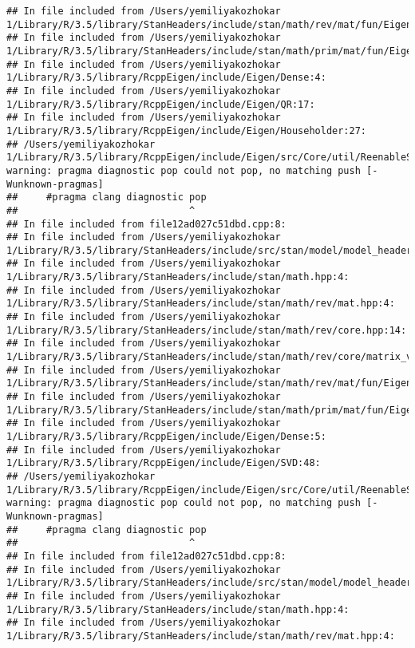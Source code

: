 \documentclass[]{article}
\begin{document}
\begin{verbatim}
## In file included from /Users/yemiliyakozhokar 1/Library/R/3.5/library/StanHeaders/include/stan/math/rev/mat/fun/Eigen_NumTraits.hpp:4:
## In file included from /Users/yemiliyakozhokar 1/Library/R/3.5/library/StanHeaders/include/stan/math/prim/mat/fun/Eigen.hpp:4:
## In file included from /Users/yemiliyakozhokar 1/Library/R/3.5/library/RcppEigen/include/Eigen/Dense:4:
## In file included from /Users/yemiliyakozhokar 1/Library/R/3.5/library/RcppEigen/include/Eigen/QR:17:
## In file included from /Users/yemiliyakozhokar 1/Library/R/3.5/library/RcppEigen/include/Eigen/Householder:27:
## /Users/yemiliyakozhokar 1/Library/R/3.5/library/RcppEigen/include/Eigen/src/Core/util/ReenableStupidWarnings.h:10:30: warning: pragma diagnostic pop could not pop, no matching push [-Wunknown-pragmas]
##     #pragma clang diagnostic pop
##                              ^
## In file included from file12ad027c51dbd.cpp:8:
## In file included from /Users/yemiliyakozhokar 1/Library/R/3.5/library/StanHeaders/include/src/stan/model/model_header.hpp:4:
## In file included from /Users/yemiliyakozhokar 1/Library/R/3.5/library/StanHeaders/include/stan/math.hpp:4:
## In file included from /Users/yemiliyakozhokar 1/Library/R/3.5/library/StanHeaders/include/stan/math/rev/mat.hpp:4:
## In file included from /Users/yemiliyakozhokar 1/Library/R/3.5/library/StanHeaders/include/stan/math/rev/core.hpp:14:
## In file included from /Users/yemiliyakozhokar 1/Library/R/3.5/library/StanHeaders/include/stan/math/rev/core/matrix_vari.hpp:4:
## In file included from /Users/yemiliyakozhokar 1/Library/R/3.5/library/StanHeaders/include/stan/math/rev/mat/fun/Eigen_NumTraits.hpp:4:
## In file included from /Users/yemiliyakozhokar 1/Library/R/3.5/library/StanHeaders/include/stan/math/prim/mat/fun/Eigen.hpp:4:
## In file included from /Users/yemiliyakozhokar 1/Library/R/3.5/library/RcppEigen/include/Eigen/Dense:5:
## In file included from /Users/yemiliyakozhokar 1/Library/R/3.5/library/RcppEigen/include/Eigen/SVD:48:
## /Users/yemiliyakozhokar 1/Library/R/3.5/library/RcppEigen/include/Eigen/src/Core/util/ReenableStupidWarnings.h:10:30: warning: pragma diagnostic pop could not pop, no matching push [-Wunknown-pragmas]
##     #pragma clang diagnostic pop
##                              ^
## In file included from file12ad027c51dbd.cpp:8:
## In file included from /Users/yemiliyakozhokar 1/Library/R/3.5/library/StanHeaders/include/src/stan/model/model_header.hpp:4:
## In file included from /Users/yemiliyakozhokar 1/Library/R/3.5/library/StanHeaders/include/stan/math.hpp:4:
## In file included from /Users/yemiliyakozhokar 1/Library/R/3.5/library/StanHeaders/include/stan/math/rev/mat.hpp:4:

\end{verbatim}
\end{document}

